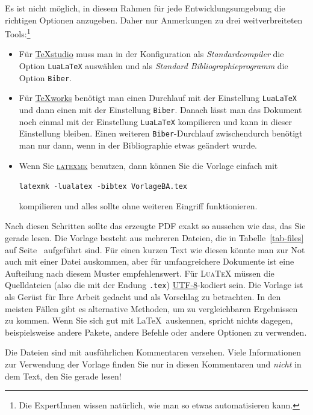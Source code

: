 Es ist nicht möglich, in diesem Rahmen für jede Entwicklungsumgebung die
richtigen Optionen anzugeben.  Daher nur Anmerkungen zu drei weitverbreiteten
Tools:\footnote{Die ExpertInnen wissen natürlich, wie man so etwas
  automatisieren kann.}
\begin{itemize}
\item Für \href{https://de.wikipedia.org/wiki/TeXstudio}{{\TeX}studio} muss
  man in der Konfiguration als \textit{Standardcompiler} die Option
  \texttt{LuaLaTeX} auswählen und als \textit{Standard Bibliographieprogramm}
  die Option \texttt{Biber}.
\item Für \href{https://de.wikipedia.org/wiki/TeXworks}{{\TeX}works} benötigt
  man einen Durchlauf mit der Einstellung \texttt{LuaLaTeX} und dann einen mit
  der Einstellung \texttt{Biber}.  Danach lässt man das Dokument noch einmal
  mit der Einstellung \texttt{LuaLaTeX} kompilieren und kann in dieser
  Einstellung bleiben.  Einen weiteren \texttt{Biber}-Durchlauf zwischendurch
  benötigt man nur dann, wenn in der Bibliographie etwas geändert wurde.
\item Wenn Sie \href{https://www.ctan.org/pkg/latexmk/}{\textsc{latexmk}}
  benutzen, dann können Sie die Vorlage einfach mit
  \begin{center}
    \verb|latexmk -lualatex -bibtex VorlageBA.tex|
  \end{center}
  kompilieren und alles sollte ohne weiteren Eingriff funktionieren.
\end{itemize}

Nach diesen Schritten sollte das erzeugte PDF exakt so aussehen wie das, das
Sie gerade lesen.  Die Vorlage besteht aus mehreren Dateien, die in
Tabelle~\ref{tab-files} auf Seite~\pageref{tab-files} aufgeführt sind.  Für
einen kurzen Text wie diesen könnte man zur Not auch mit einer Datei
auskommen, aber für umfangreichere Dokumente ist eine Aufteilung nach diesem
Muster empfehlenswert.  Für \textsc{Lua\TeX} müssen die Quelldateien (also die
mit der Endung \texttt{.tex})
\href{https://de.wikipedia.org/wiki/UTF-8}{UTF-8}-kodiert sein.  Die Vorlage
ist als Gerüst für Ihre Arbeit gedacht und als Vorschlag zu betrachten.  In
den meisten Fällen gibt es alternative Methoden, um zu vergleichbaren
Ergebnissen zu kommen.  Wenn Sie sich gut mit \LaTeX\ auskennen, spricht
nichts dagegen, beispielsweise andere Pakete, andere Befehle oder andere
Optionen zu verwenden.

Die Dateien sind mit ausführlichen Kommentaren versehen.  Viele Informationen
zur Verwendung der Vorlage finden Sie nur in diesen Kommentaren und
\textit{nicht} in dem Text, den Sie gerade lesen!

